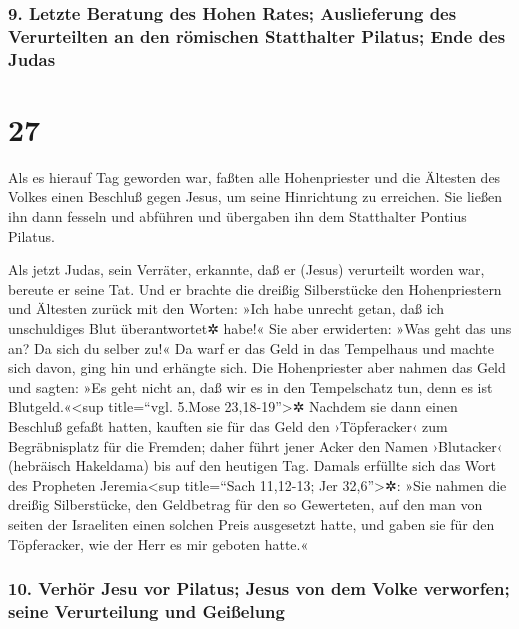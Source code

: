 \hypertarget{letzte-beratung-des-hohen-rates-auslieferung-des-verurteilten-an-den-ruxf6mischen-statthalter-pilatus-ende-des-judas}{%
\subsubsection{9. Letzte Beratung des Hohen Rates; Auslieferung des
Verurteilten an den römischen Statthalter Pilatus; Ende des
Judas}\label{letzte-beratung-des-hohen-rates-auslieferung-des-verurteilten-an-den-ruxf6mischen-statthalter-pilatus-ende-des-judas}}

\hypertarget{section-26}{%
\section{27}\label{section-26}}

 Als es hierauf Tag geworden war, faßten alle
Hohenpriester und die Ältesten des Volkes einen Beschluß gegen Jesus, um
seine Hinrichtung zu erreichen.  Sie ließen ihn dann
fesseln und abführen und übergaben ihn dem Statthalter Pontius Pilatus.

 Als jetzt Judas, sein Verräter, erkannte, daß er (Jesus)
verurteilt worden war, bereute er seine Tat. Und er brachte die dreißig
Silberstücke den Hohenpriestern und Ältesten zurück  mit
den Worten: »Ich habe unrecht getan, daß ich unschuldiges Blut
überantwortet✲ habe!« Sie aber erwiderten: »Was geht das uns an? Da sich
du selber zu!«  Da warf er das Geld in das Tempelhaus und
machte sich davon, ging hin und erhängte sich.  Die
Hohenpriester aber nahmen das Geld und sagten: »Es geht nicht an, daß
wir es in den Tempelschatz tun, denn es ist Blutgeld.«\textless sup
title=``vgl. 5.Mose 23,18-19''\textgreater✲  Nachdem sie
dann einen Beschluß gefaßt hatten, kauften sie für das Geld den
›Töpferacker‹ zum Begräbnisplatz für die Fremden;  daher
führt jener Acker den Namen ›Blutacker‹ (hebräisch Hakeldama) bis auf
den heutigen Tag.  Damals erfüllte sich das Wort des
Propheten Jeremia\textless sup title=``Sach 11,12-13; Jer
32,6''\textgreater✲: »Sie nahmen die dreißig Silberstücke, den
Geldbetrag für den so Gewerteten, auf den man von seiten der Israeliten
einen solchen Preis ausgesetzt hatte,  und gaben sie für
den Töpferacker, wie der Herr es mir geboten hatte.«

\hypertarget{verhuxf6r-jesu-vor-pilatus-jesus-von-dem-volke-verworfen-seine-verurteilung-und-geiuxdfelung}{%
\subsubsection{10. Verhör Jesu vor Pilatus; Jesus von dem Volke
verworfen; seine Verurteilung und
Geißelung}\label{verhuxf6r-jesu-vor-pilatus-jesus-von-dem-volke-verworfen-seine-verurteilung-und-geiuxdfelung}}

